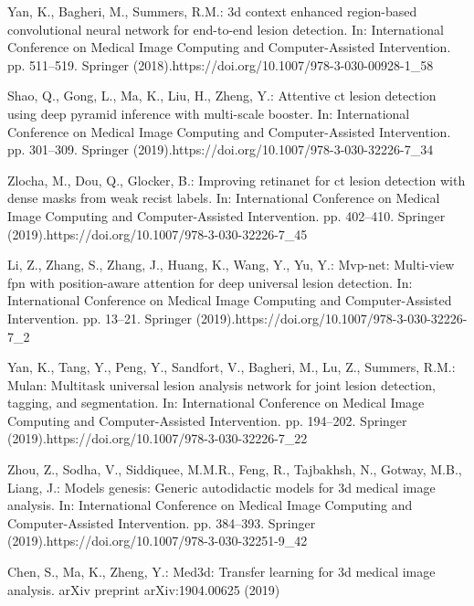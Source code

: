 \documentclass[runningheads]{llncs}
\begin{document}
\begin{thebibliography}{10}
\providecommand{\url}[1]{\texttt{#1}}
\providecommand{\urlprefix}{URL }
\providecommand{\doi}[1]{https://doi.org/#1}


Yan, K., Bagheri, M., Summers, R.M.: 3d context enhanced region-based
  convolutional neural network for end-to-end lesion detection. In:
  International Conference on Medical Image Computing and Computer-Assisted
  Intervention. pp. 511--519. Springer (2018).\doi{10.1007/978-3-030-00928-1\_58}

Shao, Q., Gong, L., Ma, K., Liu, H., Zheng, Y.: Attentive ct lesion detection
  using deep pyramid inference with multi-scale booster. In: International
  Conference on Medical Image Computing and Computer-Assisted Intervention. pp.
  301--309. Springer (2019).\doi{10.1007/978-3-030-32226-7\_34}

Zlocha, M., Dou, Q., Glocker, B.: Improving retinanet for ct lesion detection
  with dense masks from weak recist labels. In: International Conference on
  Medical Image Computing and Computer-Assisted Intervention. pp. 402--410.
  Springer (2019).\doi{10.1007/978-3-030-32226-7\_45}

Li, Z., Zhang, S., Zhang, J., Huang, K., Wang, Y., Yu, Y.: Mvp-net: Multi-view
  fpn with position-aware attention for deep universal lesion detection. In:
  International Conference on Medical Image Computing and Computer-Assisted
  Intervention. pp. 13--21. Springer (2019).\doi{10.1007/978-3-030-32226-7\_2}

Yan, K., Tang, Y., Peng, Y., Sandfort, V., Bagheri, M., Lu, Z., Summers, R.M.:
  Mulan: Multitask universal lesion analysis network for joint lesion
  detection, tagging, and segmentation. In: International Conference on Medical
  Image Computing and Computer-Assisted Intervention. pp. 194--202. Springer
  (2019).\doi{10.1007/978-3-030-32226-7\_22}

Zhou, Z., Sodha, V., Siddiquee, M.M.R., Feng, R., Tajbakhsh, N., Gotway, M.B.,
  Liang, J.: Models genesis: Generic autodidactic models for 3d medical image
  analysis. In: International Conference on Medical Image Computing and
  Computer-Assisted Intervention. pp. 384--393. Springer (2019).\doi{10.1007/978-3-030-32251-9\_42}

Chen, S., Ma, K., Zheng, Y.: Med3d: Transfer learning for 3d medical image
  analysis. arXiv preprint arXiv:1904.00625  (2019)


\end{thebibliography}
\end{document}
